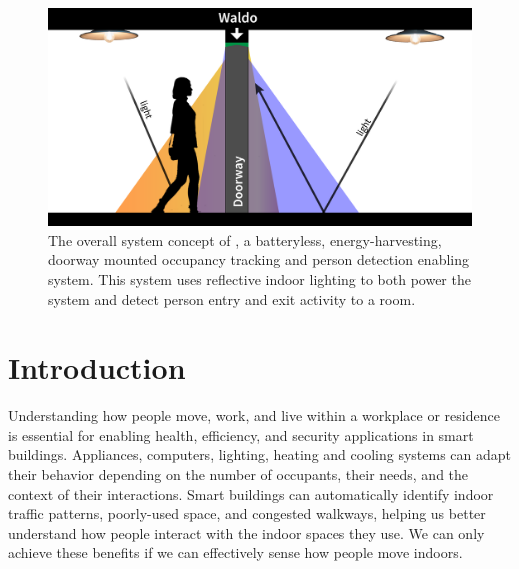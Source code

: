 \begin{figure}[t]
\centering
\includegraphics[width=0.9\columnwidth]{figs/scenario.png}
\caption{ The overall system concept of \sysname, a batteryless, energy-harvesting, doorway mounted occupancy tracking and person detection enabling system.  This system uses reflective indoor lighting to both power the system and detect person entry and exit activity to a room.\label{fig:syspic}}
\end{figure}

\section{Introduction}
\label{sec:intro}

Understanding how people move, work, and live within a workplace or residence is essential for enabling health, efficiency, and security applications in smart buildings.
Appliances, computers, lighting, heating and cooling systems can adapt their behavior depending on the number of occupants, their needs, and the context of their interactions.
Smart buildings can automatically identify indoor traffic patterns, poorly-used space, and congested walkways, helping us better understand how people interact with the indoor spaces they use.
We can only achieve these benefits if we can effectively sense how people move indoors.


